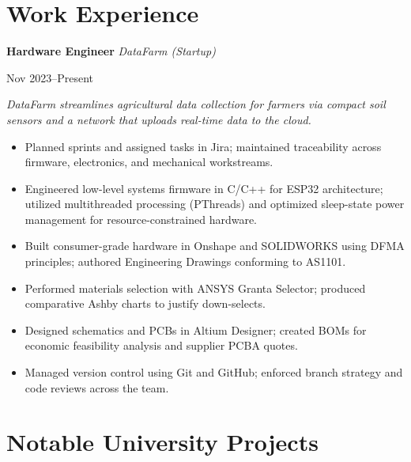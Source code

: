 \documentclass[11pt,a4paper]{article}
\begin{document}
\section{Work Experience}
\textbf{Hardware Engineer} \textbar{} \textit{DataFarm (Startup)} \hfill
\vspace{-8pt} %
\begin{flushright}
    {Nov 2023--Present}
\end{flushright}
\vspace{-8pt} %
\textit{DataFarm streamlines agricultural data collection for farmers via compact soil sensors and a network that uploads real-time data to the cloud.}
\begin{itemize}
    \item Planned sprints and assigned tasks in Jira; maintained traceability across firmware, electronics, and mechanical workstreams.
    \item Engineered low-level systems firmware in C/C++ for ESP32 architecture; utilized multithreaded processing (PThreads) and optimized sleep-state power management for resource-constrained hardware.
    \item Built consumer-grade hardware in Onshape and SOLIDWORKS using DFMA principles; authored Engineering Drawings conforming to AS1101.
    \item Performed materials selection with ANSYS Granta Selector; produced comparative Ashby charts to justify down-selects.
    \item Designed schematics and PCBs in Altium Designer; created BOMs for economic feasibility analysis and supplier PCBA quotes.
    \item Managed version control using Git and GitHub; enforced branch strategy and code reviews across the team.
\end{itemize}

\section{Notable University Projects}
\end{document}
